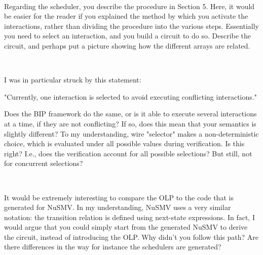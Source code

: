 ~

\done
{}


Regarding the scheduler, you describe the procedure in Section 5. Here, it
would be easier for the reader if you explained the method by which you
activate the interactions, rather than dividing the procedure into the various
steps. Essentially you need to select an interaction, and you build a circuit
to do so. Describe the circuit, and perhaps put a picture showing how the
different arrays are related.

~

\done
{}

I was in particular struck by this statement:

"Currently, one interaction is selected to avoid executing conflicting
interactions."

Does the BIP framework do the same, or is it able to execute several
interactions at a time, if they are not conflicting? If so, does this mean
that your semantics is slightly different? To my understanding, wire
"selector" makes a non-deterministic choice, which is evaluated under all
possible values during verification. Is this right? I.e., does the
verification account for all possible selections? But still, not for
concurrent selections?


~

\done
{}


It would be extremely interesting to compare the OLP to the code that is
generated for NuSMV. In my understanding, NuSMV uses a very similar notation:
the transition relation is defined using next-state expressions. In fact, I
would argue that you could simply start from the generated NuSMV to derive the
circuit, instead of introducing the OLP. Why didn't you follow this path? Are
there differences in the way for instance the schedulers are generated?


